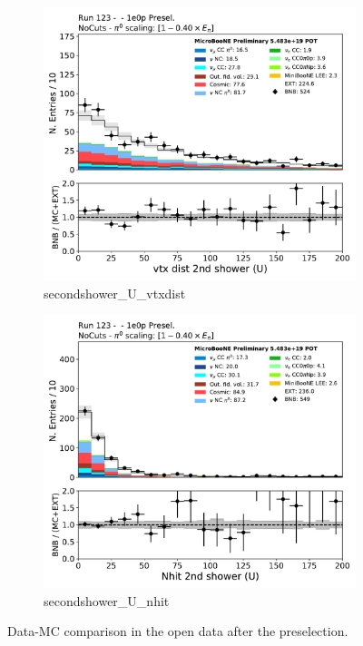 \begin{figure}[H] 
\begin{center}
    \begin{subfigure}[b]{0.3\textwidth}
    \centering
    \includegraphics[width=1.00\textwidth]{1e0p/dataMCRun123/secondshower_U_vtxdist.pdf}
    \caption{\label{fig:1e0p:dataMCRun1:secondshower_U_vtxdist} secondshower\_U\_vtxdist }
    \end{subfigure}
    \begin{subfigure}[b]{0.3\textwidth}
    \centering
    \includegraphics[width=1.00\textwidth]{1e0p/dataMCRun123/secondshower_U_nhit.pdf}
    \caption{\label{fig:1e0p:dataMCRun1:secondshower_U_nhit} secondshower\_U\_nhit }
    \end{subfigure}
\caption{\label{fig:1e0p:dataMCRun1:pi01}Data-MC comparison in the open data after the \zpsel preselection.}
\end{center}
\end{figure}

